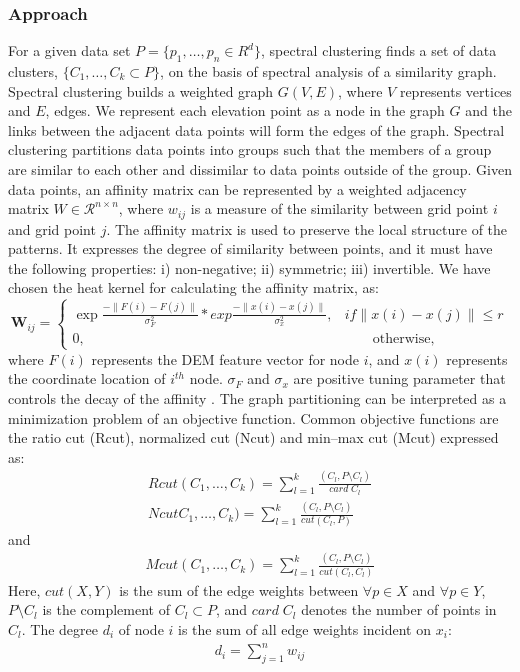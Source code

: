 \documentclass[12pt,letterpaper]{article}
\begin{document}
\subsubsection{Approach}
For a given data set $P = \{ p_1,\dots, p_n \in R^d \}$, spectral clustering finds a set of data clusters, $\{C_1,\dots, C_k \subset P\}$,
on the basis of spectral analysis of a similarity graph. Spectral clustering builds a weighted graph $G(V,E)$, where $V$ represents vertices and $E$, edges. 
We represent each elevation point as a node in the graph $G$ and the links between the adjacent data points will form the edges of the graph. Spectral clustering partitions data points into groups such that the members of a group are similar to each other and dissimilar to data points outside of the group. Given data points, an affinity matrix can be represented by a weighted adjacency matrix $W \in \mathcal{R}^{n\times n}$, where $w_{ij}$ is a measure
of the similarity between grid point $i$ and grid point $j$. The affinity matrix is used to preserve the local structure of the patterns. It expresses the degree of similarity between points, and
it must have the following properties: i) non-negative; ii) symmetric; iii) invertible.
We have chosen the heat kernel for calculating the affinity matrix, as:
\begin{equation}
{\mathbf W_{ij}} = \left\{
\begin{array}{rl}
\exp{\frac{- \parallel F(i) - F(j) \parallel}{\sigma_F^2}}*exp{\frac{- \parallel x(i) - x(j) \parallel}{\sigma_x^2}}, & if \parallel x(i) - x(j) \parallel \le r\\
0, & \qquad \text{otherwise},
\end{array} 
\right.
\label{eq:eq1}
\end{equation} 
where $F(i)$ represents the DEM feature vector for node $i$, and $x(i)$ represents the coordinate location of $i^{th}$ node.
$\sigma_F $ and $\sigma_x$ are positive tuning parameter that controls the decay of the affinity \citep{Tung2010}.
The graph partitioning can be interpreted as a minimization problem of an objective function. Common objective functions are
the ratio cut (Rcut), normalized cut (Ncut) and min--max cut (Mcut) expressed as:
\begin{align}
Rcut (C_1,\dots,C_k) = \sum_{l=1}^k \frac{(C_l, P \setminus C_l)}{card\; C_l} \\
Ncut C_1,\dots,C_k) = \sum_{l=1}^k \frac{(C_l, P \setminus C_l)}{cut (C_l, P)}
\end{align}
and
\begin{align}
Mcut (C_1,\dots,C_k) = \sum_{l=1}^k \frac{(C_l, P \setminus C_l)}{cut (C_l,C_l)} 
\end{align}
Here, $cut(X,Y)$ is the sum of the edge weights between $\forall p \in X$ and $\forall p \in Y$, $P\setminus C_l$ is the complement
of $C_l \subset P$, and $card\; C_l$ denotes the number of points in $C_l$.
The degree $d_i$ of node $i$ is the sum of all edge weights incident on $x_i$:
\begin{align}
d_i = \sum_{j=1}^n w_{ij}
\end{align} 
\end{document}

